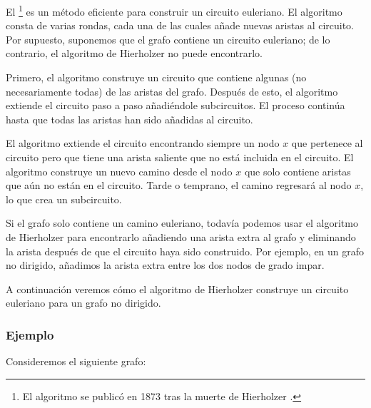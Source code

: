El \footnote{El algoritmo se publicó
en 1873 tras la muerte de Hierholzer \cite{hie73}.} es un método
eficiente para construir
un circuito euleriano.
El algoritmo consta de varias rondas,
cada una de las cuales añade nuevas aristas al circuito.
Por supuesto, suponemos que el grafo contiene
un circuito euleriano; de lo contrario, el algoritmo de Hierholzer
no puede encontrarlo.

Primero, el algoritmo construye un circuito que contiene
algunas (no necesariamente todas) de las aristas del grafo.
Después de esto, el algoritmo extiende el circuito
paso a paso añadiéndole subcircuitos.
El proceso continúa hasta que todas las aristas han sido añadidas
al circuito.

El algoritmo extiende el circuito encontrando siempre
un nodo $x$ que pertenece al circuito pero que tiene
una arista saliente que no está incluida en el circuito.
El algoritmo construye un nuevo camino desde el nodo $x$
que solo contiene aristas que aún no están en el circuito.
Tarde o temprano,
el camino regresará al nodo $x$,
lo que crea un subcircuito.

Si el grafo solo contiene un camino euleriano,
todavía podemos usar el algoritmo de Hierholzer
para encontrarlo añadiendo una arista extra al grafo
y eliminando la arista después de que el circuito
haya sido construido.
Por ejemplo, en un grafo no dirigido,
añadimos la arista extra entre los dos
nodos de grado impar.

A continuación veremos cómo el algoritmo de Hierholzer
construye un circuito euleriano para un grafo no dirigido.

\subsubsection{Ejemplo}

\begin{samepage}
Consideremos el siguiente grafo:
\begin{center}
\end{center}
\end{samepage}

